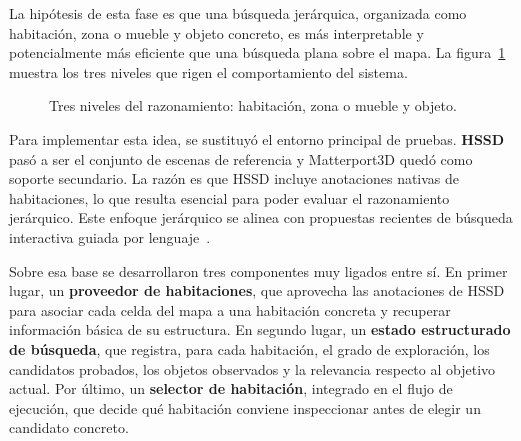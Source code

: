 \documentclass[11pt,fleqn,openany]{book} %
\let\cite=\parencite
\begin{document}
La hipótesis de esta fase es que una búsqueda jerárquica, organizada como habitación, zona o mueble y objeto concreto, es más interpretable y potencialmente más eficiente que una búsqueda plana sobre el mapa. La figura~\ref{fig:razonamiento_habitaciones} muestra los tres niveles que rigen el comportamiento del sistema.

\begin{figure}[h]
\centering
{}
\caption[Tres niveles del razonamiento de búsqueda.]{Tres niveles del razonamiento: habitación, zona o mueble y objeto.}
\label{fig:razonamiento_habitaciones}
\end{figure}

Para implementar esta idea, se sustituyó el entorno principal de pruebas. \textbf{HSSD}~\cite{khanna2024hssd} pasó a ser el conjunto de escenas de referencia y Matterport3D quedó como soporte secundario. La razón es que HSSD incluye anotaciones nativas de habitaciones, lo que resulta esencial para poder evaluar el razonamiento jerárquico. Este enfoque jerárquico se alinea con propuestas recientes de búsqueda interactiva guiada por lenguaje~\cite{honerkamp2024moma}.

Sobre esa base se desarrollaron tres componentes muy ligados entre sí. En primer lugar, un \textbf{proveedor de habitaciones}, que aprovecha las anotaciones de HSSD para asociar cada celda del mapa a una habitación concreta y recuperar información básica de su estructura. En segundo lugar, un \textbf{estado estructurado de búsqueda}, que registra, para cada habitación, el grado de exploración, los candidatos probados, los objetos observados y la relevancia respecto al objetivo actual. Por último, un \textbf{selector de habitación}, integrado en el flujo de ejecución, que decide qué habitación conviene inspeccionar antes de elegir un candidato concreto.
\end{document}
